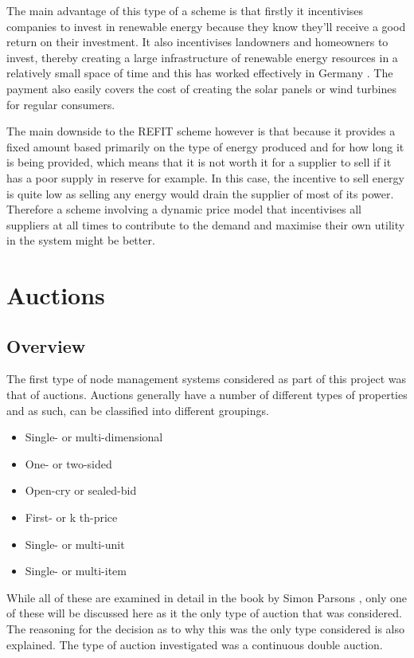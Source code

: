 \documentclass[a4paper, notitlepage]{report}
\begin{document}
The main advantage of this type of a scheme is that firstly it incentivises
companies to invest in renewable energy because they know they’ll receive a good
return on their investment. It also incentivises landowners and homeowners to
invest, thereby creating a large infrastructure of renewable energy resources in
a relatively small space of time and this has worked effectively in Germany
\cite{lauber2004refit}. The payment also easily covers the cost of creating the
solar panels or wind turbines for regular consumers.

The main downside to the REFIT scheme however is that because it provides a
fixed amount based primarily on the type of energy produced and for how long it
is being provided, which means that it is not worth it for a supplier to sell if
it has a poor supply in reserve for example. In this case, the incentive to sell
energy is quite low as selling any energy would drain the supplier of most of
its power. Therefore a scheme involving a dynamic price model that incentivises
all suppliers at all times to contribute to the demand and maximise their own
utility in the system might be better. 
\chapter{Auctions}
\label{sec:org7260975}
\section{Overview}
\label{sec:org71819a7}
The first type of node management systems considered as part of this project was
that of auctions. Auctions generally have a number of different types of
properties and as such, can be classified into different groupings. 

\begin{itemize}
\item Single- or multi-dimensional
\item One- or two-sided
\item Open-cry or sealed-bid
\item First- or k th-price
\item Single- or multi-unit
\item Single- or multi-item
\end{itemize}

While all of these are examined in detail in the book by Simon Parsons
\cite{parsons2011auctions}, only one of these will be discussed here as it the
only type of auction that was considered. The reasoning for the decision as to
why this was the only type considered is also explained. The type of auction
investigated was a continuous double auction. 
\end{document}
